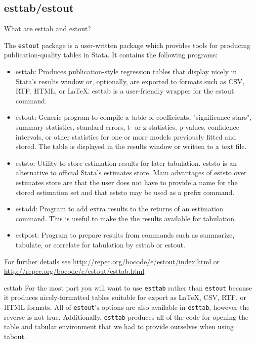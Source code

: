 \documentclass[fleqn, handout, 10pt]{beamer}
\def\lst{\lstinline}
\begin{document}
\subsection{esttab/estout}


\begin{frame}{What are esttab and estout?}
    \footnotesize{
    The \lst=estout= package is a user-written package which provides tools for producing publication-quality tables in Stata. It contains
    the following programs:
    \begin{itemize}
	\item esttab: Produces publication-style regression tables that display nicely in Stata's results window or, optionally, are exported to formats such as CSV, RTF, HTML, or \LaTeX{}. esttab is a user-friendly wrapper for the estout command. \pause
	\item estout: Generic program to compile a table of coefficients, "significance stars", summary statistics, standard errors, t- or z-statistics, p-values, confidence intervals, or other statistics for one or more models previously fitted and stored. The table is displayed in the results window or written to a text file. \pause
	\item eststo: Utility to store estimation results for later tabulation. eststo is an alternative to official Stata's estimates store. Main advantages of eststo over estimates store are that the user does not have to provide a name for the stored estimation set and that eststo may be used as a prefix command. \pause
	\item estadd: Program to add extra results to the returns of an estimation command. This is useful to make the the results available for tabulation. \pause
	\item estpost: Program to prepare results from commands such as summarize, tabulate, or correlate for tabulation by esttab or estout. \pause
    \end{itemize}
    }
    \footnotesize For further details see \url{http://repec.org/bocode/e/estout/index.html} or \\ \url{http://repec.org/bocode/e/estout/esttab.html}
\end{frame}

\begin{frame}{esttab}
    For the most part you will want to use \lst=esttab= rather than \lst=estout= because it produces nicely-formatted tables suitable
	for export as \LaTeX{}, CSV, RTF, or HTML formats. All of \lst=estout='s options are also available in \lst=esttab=, however the
	reverse is not true. Additionally, \lst=esttab= produces all of the code for opening the table and tabular environment that we had
	to provide ourselves when using tabout.
\end{frame}
\end{document}
